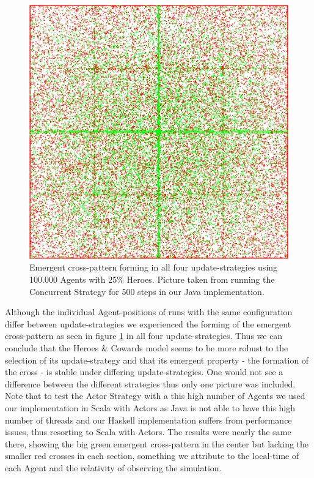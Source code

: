 \begin{figure}[H]
	\centering
  \includegraphics[width=.4\textwidth, angle=0]{./fig/con_HAC_100_000_500steps_haskell.png}
	\caption{Emergent cross-pattern forming in all four update-strategies using 100.000 Agents with 25\% Heroes. Picture taken from running the Concurrent Strategy for 500 steps in our Java implementation.}
	\label{fig:hac_strategies}
\end{figure}

Although the individual Agent-positions of runs with the same configuration differ between update-strategies we experienced the forming of the emergent cross-pattern as seen in figure \ref{fig:hac_strategies} in all four update-strategies. Thus we can conclude that the Heroes \& Cowards model seems to be more robust to the selection of its update-strategy and that its emergent property - the formation of the cross - is stable under differing update-strategies. One would not see a difference between the different strategies thus only one picture was included. Note that to test the Actor Strategy with a this high number of Agents we used our implementation in Scala with Actors as Java is not able to have this high number of threads and our Haskell implementation suffers from performance issues, thus resorting to Scala with Actors. The results were nearly the same there, showing the big green emergent cross-pattern in the center but lacking the smaller red crosses in each section, something we attribute to the local-time of each Agent and the relativity of observing the simulation.